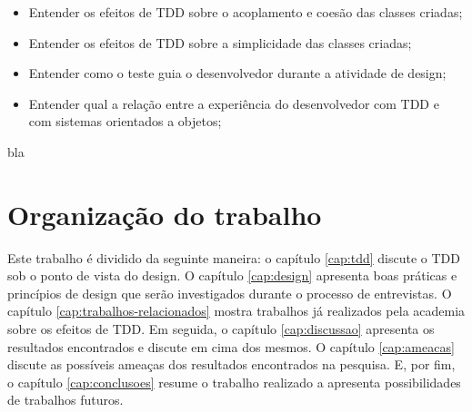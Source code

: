 \begin{itemize}
  \item Entender os efeitos de TDD sobre o acoplamento e coesão das classes
  criadas;

  \item Entender os efeitos de TDD sobre a simplicidade das classes criadas;

  \item Entender como o teste guia o desenvolvedor durante a atividade de
  design;

  \item Entender qual a relação entre a experiência do desenvolvedor com TDD e
  com sistemas orientados a objetos;
\end{itemize}
bla

\section{Organização do trabalho}

Este trabalho é dividido da seguinte maneira: o capítulo \ref{cap:tdd} discute o
TDD sob o ponto de vista do design. O capítulo \ref{cap:design} apresenta boas
práticas e princípios de design que serão investigados durante o processo de
entrevistas. O capítulo \ref{cap:trabalhos-relacionados} mostra trabalhos já
realizados pela academia sobre os efeitos de TDD. Em seguida, o capítulo
\ref{cap:discussao} apresenta os resultados encontrados e discute em cima dos
mesmos. O capítulo \ref{cap:ameacas} discute as possíveis ameaças dos resultados
encontrados na pesquisa. E, por fim, o capítulo \ref{cap:conclusoes} resume o
trabalho realizado a apresenta possibilidades de trabalhos futuros.
